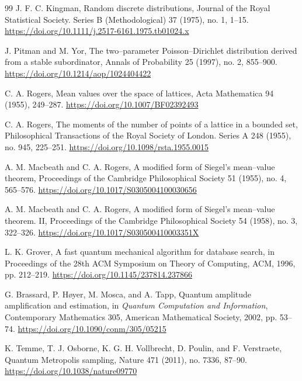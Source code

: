 \documentclass[a4paper,12pt]{article}
\theoremstyle{definition}
\theoremstyle{remark}
\begin{document}
\begin{thebibliography}{99}
J. F. C. Kingman,
Random discrete distributions,
Journal of the Royal Statistical Society. Series B (Methodological)
37 (1975), no. 1, 1--15.
\url{https://doi.org/10.1111/j.2517-6161.1975.tb01024.x}

J. Pitman and M. Yor,
The two--parameter Poisson--Dirichlet distribution derived from a stable subordinator,
Annals of Probability 25 (1997), no. 2, 855--900.
\url{https://doi.org/10.1214/aop/1024404422}

C. A. Rogers,
Mean values over the space of lattices,
Acta Mathematica 94 (1955), 249--287.
\url{https://doi.org/10.1007/BF02392493}

C. A. Rogers,
The moments of the number of points of a lattice in a bounded set,
Philosophical Transactions of the Royal Society of London. Series A
248 (1955), no. 945, 225--251.
\url{https://doi.org/10.1098/rsta.1955.0015}

A. M. Macbeath and C. A. Rogers,
A modified form of Siegel's mean--value theorem,
Proceedings of the Cambridge Philosophical Society
51 (1955), no. 4, 565--576.
\url{https://doi.org/10.1017/S0305004100030656}

A. M. Macbeath and C. A. Rogers,
A modified form of Siegel's mean--value theorem. II,
Proceedings of the Cambridge Philosophical Society
54 (1958), no. 3, 322--326.
\url{https://doi.org/10.1017/S030500410003351X}

L. K. Grover,
A fast quantum mechanical algorithm for database search,
in Proceedings of the 28th ACM Symposium on Theory of Computing,
ACM, 1996, pp. 212--219.
\url{https://doi.org/10.1145/237814.237866}

G. Brassard, P. H{\o}yer, M. Mosca, and A. Tapp,
Quantum amplitude amplification and estimation,
in {\em Quantum Computation and Information},
Contemporary Mathematics 305,
American Mathematical Society, 2002, pp. 53--74.
\url{https://doi.org/10.1090/conm/305/05215}

K. Temme, T. J. Osborne, K. G. H. Vollbrecht, D. Poulin, and F. Verstraete,
Quantum Metropolis sampling,
Nature 471 (2011), no. 7336, 87--90.
\url{https://doi.org/10.1038/nature09770}

\end{thebibliography}
\end{document}
